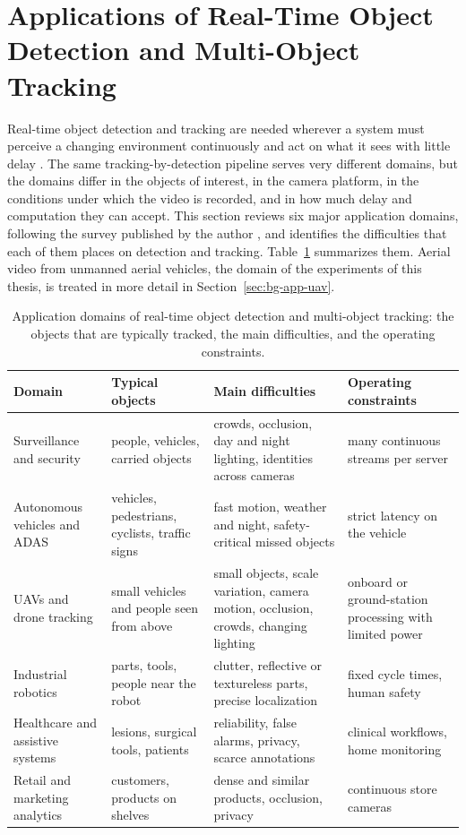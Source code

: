 \section{Applications of Real-Time Object Detection and Multi-Object Tracking}\label{sec:bg-apps}
Real-time object detection and tracking are needed wherever a system must perceive a changing environment continuously and act on what it sees with little delay \cite{li2025motreview,ismail2026realtime}. The same tracking-by-detection pipeline serves very different domains, but the domains differ in the objects of interest, in the camera platform, in the conditions under which the video is recorded, and in how much delay and computation they can accept. This section reviews six major application domains, following the survey published by the author \cite{ismail2026realtime}, and identifies the difficulties that each of them places on detection and tracking. Table~\ref{tab:bg-apps} summarizes them. Aerial video from unmanned aerial vehicles, the domain of the experiments of this thesis, is treated in more detail in Section~\ref{sec:bg-app-uav}.

\begin{table}[tbp]
\centering
\caption{Application domains of real-time object detection and multi-object tracking: the objects that are typically tracked, the main difficulties, and the operating constraints.}
\label{tab:bg-apps}
\footnotesize\setlength{\tabcolsep}{4pt}\renewcommand{\arraystretch}{1.25}
\begin{tabular}{>{\raggedright\arraybackslash}p{2.9cm}>{\raggedright\arraybackslash}p{3.2cm}>{\raggedright\arraybackslash}p{4.5cm}>{\raggedright\arraybackslash}p{3.5cm}}
\toprule
Domain & Typical objects & Main difficulties & Operating constraints\\
\midrule
Surveillance and security & people, vehicles, carried objects & crowds, occlusion, day and night lighting, identities across cameras & many continuous streams per server\\
Autonomous vehicles and ADAS & vehicles, pedestrians, cyclists, traffic signs & fast motion, weather and night, safety-critical missed objects & strict latency on the vehicle\\
UAVs and drone tracking & small vehicles and people seen from above & small objects, scale variation, camera motion, occlusion, crowds, changing lighting & onboard or ground-station processing with limited power\\
Industrial robotics & parts, tools, people near the robot & clutter, reflective or textureless parts, precise localization & fixed cycle times, human safety\\
Healthcare and assistive systems & lesions, surgical tools, patients & reliability, false alarms, privacy, scarce annotations & clinical workflows, home monitoring\\
Retail and marketing analytics & customers, products on shelves & dense and similar products, occlusion, privacy & continuous store cameras\\
\bottomrule
\end{tabular}
\end{table}

